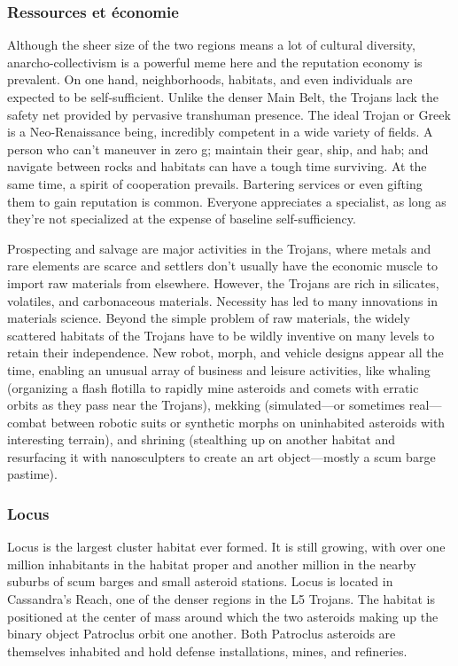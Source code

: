 \subsubsection{Ressources et économie} \label{sec:trojans-resources-economics} 

Although the sheer size of the two regions means a lot of cultural diversity, anarcho-collectivism is a powerful meme here and the reputation economy is prevalent. On one hand, neighborhoods, habitats, and even individuals are expected to be self-sufficient. Unlike the denser Main Belt, the Trojans lack the safety net provided by pervasive transhuman presence. The ideal Trojan or Greek is a Neo-Renaissance being, incredibly competent in a wide variety of fields. A person who can't maneuver in zero g; maintain their gear, ship, and hab; and navigate between rocks and habitats can have a tough time surviving. At the same time, a spirit of cooperation prevails. Bartering services or even gifting them to gain reputation is common. Everyone appreciates a specialist, as long as they're not specialized at the expense of baseline self-sufficiency. 

Prospecting and salvage are major activities in the Trojans, where metals and rare elements are scarce and settlers don't usually have the economic muscle to import raw materials from elsewhere. However, the Trojans are rich in silicates, volatiles, and carbonaceous materials. Necessity has led to many innovations in materials science. Beyond the simple problem of raw materials, the widely scattered habitats of the Trojans have to be wildly inventive on many levels to retain their independence. New robot, morph, and vehicle designs appear all the time, enabling an unusual array of business and leisure activities, like whaling (organizing a flash flotilla to rapidly mine asteroids and comets with erratic orbits as they pass near the Trojans), mekking (simulated—or sometimes real—combat between robotic suits or synthetic morphs on uninhabited asteroids with interesting terrain), and shrining (stealthing up on another habitat and resurfacing it with nanosculpters to create an art object—mostly a scum barge pastime). 

\subsubsection{Locus} \label{sec:locus} 

Locus is the largest cluster habitat ever formed. It is still growing, with over one million inhabitants in the habitat proper and another million in the nearby suburbs of scum barges and small asteroid stations. Locus is located in Cassandra's Reach, one of the denser regions in the L5 Trojans. The habitat is positioned at the center of mass around which the two asteroids making up the binary object Patroclus orbit one another. Both Patroclus asteroids are themselves inhabited and hold defense installations, mines, and refineries. 

